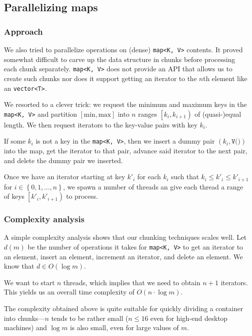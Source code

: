 \documentclass[a4paper,12pt]{article}
\newcommand{\shorttypename}[1]{\texttt{#1}}
\newcommand{\typename}[2]{\texttt{#2}} %
\begin{document}
\subsection{Parallelizing maps}

\subsubsection{Approach}

We also tried to parallelize operations on (dense) \typename{std}{map<K, V>} contents. It proved somewhat difficult to carve up the data structure in chunks before processing each chunk separately. \typename{std}{map<K, V>} does not provide an API that allows us to create such chunks nor does it support getting an iterator to the $n$th element like an \typename{std}{vector<T>}.

We resorted to a clever trick: we request the minimum and maximum keys in the \typename{std}{map<K, V>} and partition $\left[\text{min}, \text{max}\right]$ into $n$ ranges $\left[k_i, k_{i+1}\right)$ of (quasi-)equal length. We then request iterators to the key-value pairs with key $k_i$.

If some $k_i$ is not a key in the \typename{std}{map<K, V>}, then we insert a dummy pair $\left(k_i, \shorttypename{V()}\right)$ into the map, get the iterator to that pair, advance said iterator to the next pair, and delete the dummy pair we inserted.

Once we have an iterator starting at key $k'_i$ for each $k_i$ such that $k_i \le k'_i \le k'_{i+1}$ for $i \in \left\{0, 1, \dots, n\right\}$, we spawn a number of threads an give each thread a range of keys $\left[k'_i, k'_{i+1}\right)$ to process.

\subsubsection{Complexity analysis}

A simple complexity analysis shows that our chunking techniques scales well. Let $d\left(m\right)$ be the number of operations it takes for \typename{std}{map<K, V>} to get an iterator to an element, insert an element, increment an iterator, and delete an element. We know that $d \in O\left(\log m\right)$.

We want to start $n$ threads, which implies that we need to obtain $n + 1$ iterators. This yields us an overall time complexity of $O\left(n \cdot \log m\right)$.

The complexity obtained above is quite suitable for quickly dividing a container into chunks---$n$ tends to be rather small ($n \le 16$ even for high-end desktop machines) and $\log m$ is also small, even for large values of $m$.
\end{document}
